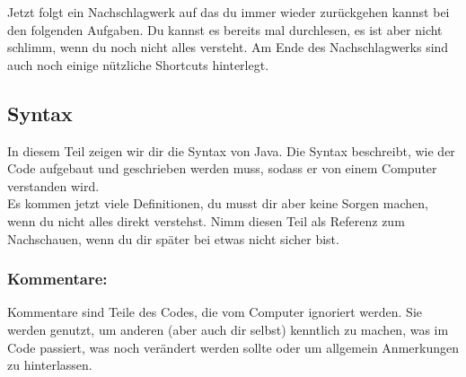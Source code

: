 
\label{ex2}

Jetzt folgt ein Nachschlagwerk auf das du immer wieder zurückgehen kannst bei den folgenden Aufgaben.
Du kannst es bereits mal durchlesen, es ist aber nicht schlimm, wenn du noch nicht alles versteht. Am Ende des Nachschlagwerks sind auch noch einige nützliche Shortcuts hinterlegt.

\subsection*{Syntax}
\noindent
In diesem Teil zeigen wir dir die Syntax von Java.
Die Syntax beschreibt, wie der Code aufgebaut und geschrieben werden muss, sodass er von einem Computer verstanden wird.\\
Es kommen jetzt viele Definitionen, du musst dir aber keine Sorgen machen, wenn du nicht alles direkt verstehst.
Nimm diesen Teil als Referenz zum Nachschauen, wenn du dir später bei etwas nicht sicher bist.

\begin{Infobox}

	\subsubsection*{Kommentare:}
	Kommentare sind Teile des Codes, die vom Computer ignoriert werden.
	Sie werden genutzt, um anderen (aber auch dir selbst) kenntlich zu machen, was im Code passiert, was noch verändert werden sollte oder um allgemein Anmerkungen zu hinterlassen.
\end{Infobox}

